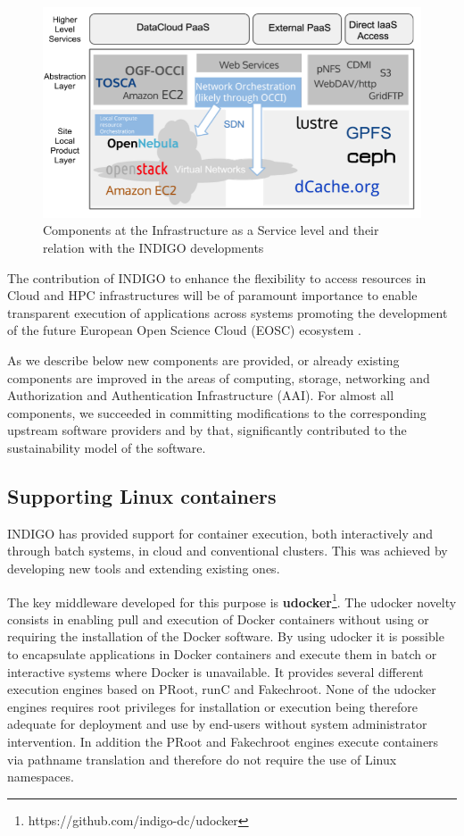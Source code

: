 \documentclass{article}
\begin{document}
\begin{figure}
  \centering
  \includegraphics[width=\textwidth]{./figs/Figure1.pdf}
  \caption{Components at the Infrastructure as a Service level and their relation with the INDIGO developments}
  \label{fig:1}
\end{figure}



The contribution of INDIGO to enhance the flexibility to access resources in Cloud and HPC infrastructures will be of paramount  importance to  enable  transparent  execution  of  applications  across  systems promoting the development of the future European Open Science Cloud (EOSC) ecosystem \cite{EOSC}.

As we describe below new components  are  provided,  or already  existing  components  are improved  in  the areas   of   computing,   storage,   networking and Authorization and Authentication Infrastructure (AAI).   For   almost   all   components, we succeeded in committing modifications to the corresponding upstream software providers and by that, significantly contributed to  the  sustainability  model  of  the  software.

\subsection{Supporting Linux containers}
\label{sec:containers}

INDIGO  has  provided  support  for  container  execution, both  interactively  and  through  batch systems,  in cloud and conventional clusters. This was achieved by developing new tools and extending existing ones.
 
The key middleware developed for this purpose is {\bf udocker}\cite{udocker-paper}\footnote{https://github.com/indigo-dc/udocker}. The udocker novelty consists in enabling pull and execution of Docker containers \cite{DOCKER} without using or requiring the installation of the Docker software. By using udocker it is possible to encapsulate applications in Docker containers and execute them in batch or interactive systems where Docker is unavailable. It provides several different execution engines based on PRoot\cite{PROOT}, runC\cite{RUNC} and Fakechroot\cite{FAKECHROOT}. None of the udocker engines requires root privileges for installation or execution being therefore adequate for deployment and use by end-users without system administrator intervention. In addition the PRoot and Fakechroot engines execute containers via pathname translation and therefore do not require the use of Linux namespaces. 
\end{document}
